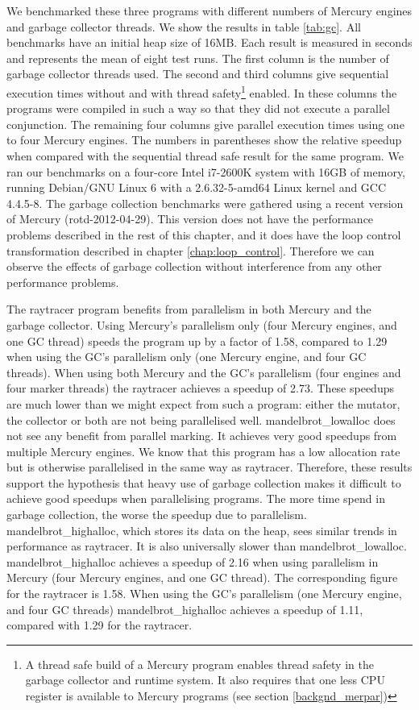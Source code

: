 We benchmarked these three programs with different numbers of Mercury
engines and garbage collector threads.
We show the results in table \ref{tab:gc}.
All benchmarks have an initial heap size of 16MB.
Each result is measured in seconds and represents the mean of eight test runs.
The first column is the number of garbage collector threads used.
The second and third columns give sequential execution times
without and with thread safety\footnote{
    A thread safe build of a Mercury program enables thread safety in the
    garbage collector and runtime system.
    It also requires that one less CPU register is available to Mercury
    programs (see section \ref{backgnd_merpar})}
enabled.
In these columns the programs were compiled in such a way so that they did
not execute a parallel conjunction.
The remaining four columns give parallel execution times using one to four
Mercury engines.
The numbers in parentheses show the relative speedup when compared with the
sequential thread safe result for the same program.
\label{cabsav}
We ran our benchmarks on
a four-core Intel i7-2600K system
with 16GB of memory,
running Debian/GNU Linux 6
with a 2.6.32-5-amd64 Linux kernel and GCC 4.4.5-8.
The garbage collection benchmarks were gathered using a recent version of
Mercury (rotd-2012-04-29).
This version does not have the performance problems described in the
rest of this chapter,
and it does have the loop control transformation described
in chapter \ref{chap:loop_control}.
Therefore we can observe the effects of garbage collection without
interference from any other performance problems.

The raytracer program benefits from parallelism in both Mercury and the
garbage collector.
Using Mercury's parallelism only (four Mercury engines, and one GC thread) 
speeds the program up by a factor of 1.58,
compared to 1.29 when using the GC's parallelism only (one Mercury engine,
and four GC threads).
When using both Mercury and the GC's parallelism (four engines and four
marker threads)
the raytracer achieves a speedup of 2.73.
These speedups are much lower than we might expect from such a program:
either the mutator, the collector or both are not being parallelised well.
mandelbrot\_lowalloc does not see any benefit from parallel marking.
It achieves very good speedups from multiple Mercury engines.
We know that this program has a low allocation rate
but is otherwise parallelised in the same way as raytracer.
Therefore,
these results support the hypothesis that heavy use of garbage collection
makes it difficult to achieve good speedups when parallelising programs.
The more time spend in garbage collection,
the worse the speedup due to parallelism.
mandelbrot\_highalloc, which stores its data on the heap,
sees similar trends in performance as raytracer.
It is also universally slower than mandelbrot\_lowalloc.
mandelbrot\_highalloc achieves a speedup of 2.16 when using parallelism in
Mercury (four Mercury engines, and one GC thread).
The corresponding figure for the raytracer is 1.58.
When using the GC's parallelism
(one Mercury engine, and four GC threads)
mandelbrot\_highalloc achieves a speedup of 1.11,
compared with 1.29 for the raytracer.

